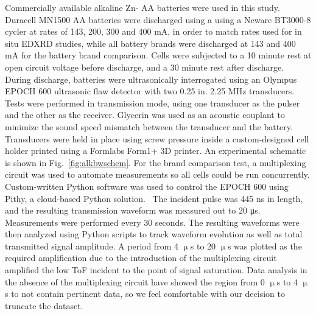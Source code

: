 Commercially available alkaline Zn- AA batteries were used in this study. Duracell MN1500 AA batteries were discharged using a using a Neware BT3000-8 cycler at rates of 143, 200, 300 and 400 mA, in order to match rates used for in situ EDXRD studies, while all battery brands were discharged at 143 and 400 mA for the battery brand comparison. Cells were subjected to a 10 minute rest at open circuit voltage before discharge, and a 30 minute rest after discharge. During discharge, batteries were ultrasonically interrogated using an Olympus EPOCH 600 ultrasonic flaw detector with two 0.25 in. 2.25 MHz transducers. Tests were performed in transmission mode, using one transducer as the pulser and the other as the receiver. Glycerin was used as an acoustic couplant to minimize the sound speed mismatch between the transducer and the battery. Transducers were held in place using screw pressure inside a custom-designed cell holder printed using a Formlabs Form1+ 3D printer. An experimental schematic is shown in Fig.~\ref{fig:alkbwschem}. For the brand comparison test, a multiplexing circuit was used to automate measurements so all cells could be run concurrently. Custom-written Python software was used to control the EPOCH 600 using Pithy, a cloud-based Python solution.~\cite{Steingart_undated-rr} The incident pulse was 445 ns in length, and the resulting transmission waveform was measured out to 20 μs. Measurements were performed every 30 seconds. The resulting waveforms were then analyzed using Python scripts to track waveform evolution as well as total transmitted signal amplitude. A period from 4 $\upmu$s to 20 $\upmu$s was plotted as the required amplification due to the introduction of the multiplexing circuit amplified the low ToF incident to the point of signal saturation. Data analysis in the absence of the multiplexing circuit have showed the region from 0 $\upmu$s to 4 $\upmu$s to not contain pertinent data, so we feel comfortable with our decision to truncate the dataset. 

